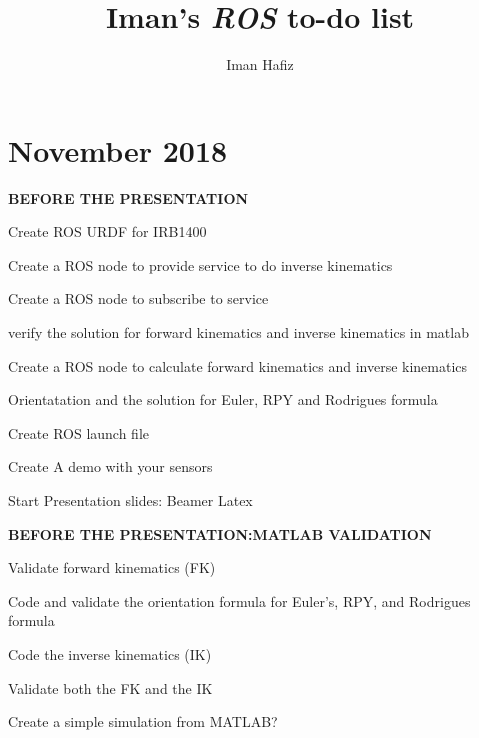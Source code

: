 \documentclass[a4paper,10pt]{article}
\title{Iman's \textit{\textbf{ROS}} to-do list}
\author{Iman Hafiz}
\begin{document}
\maketitle

\section{November 2018}
\begin{itemize}
		\item \textbf{BEFORE THE PRESENTATION}
		\item Create ROS launch file
		\item Create A demo with your sensors
		\item Start Presentation slides: Beamer Latex
		\end{todolist}

		\item \textbf{BEFORE THE PRESENTATION:MATLAB VALIDATION}
				\begin{todolist}
				\item Validate forward kinematics (FK)
						\begin{todolist}
						\item Code and validate the orientation formula for%
								Euler's, RPY, and Rodrigues formula
						\end{todolist}
				\item Code the inverse kinematics (IK)
				\item Validate both the FK and the IK
				\item Create a simple simulation from MATLAB? 
				\end{todolist}
\end{itemize}
\end{document}
